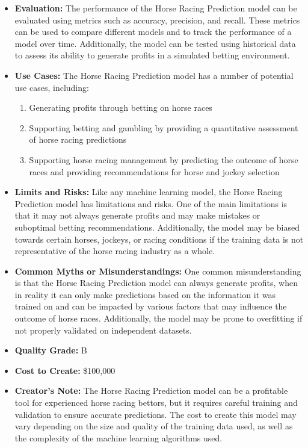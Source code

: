 \begin{itemize}
\item \textbf{Evaluation:} The performance of the Horse Racing Prediction model can be evaluated using metrics such as accuracy, precision, and recall. These metrics can be used to compare different models and to track the performance of a model over time. Additionally, the model can be tested using historical data to assess its ability to generate profits in a simulated betting environment.
\item \textbf{Use Cases:} The Horse Racing Prediction model has a number of potential use cases, including:
\begin{enumerate}
\item Generating profits through betting on horse races
\item Supporting betting and gambling by providing a quantitative assessment of horse racing predictions
\item Supporting horse racing management by predicting the outcome of horse races and providing recommendations for horse and jockey selection
\end{enumerate}
\item \textbf{Limits and Risks:} Like any machine learning model, the Horse Racing Prediction model has limitations and risks. One of the main limitations is that it may not always generate profits and may make mistakes or suboptimal betting recommendations. Additionally, the model may be biased towards certain horses, jockeys, or racing conditions if the training data is not representative of the horse racing industry as a whole.
\item \textbf{Common Myths or Misunderstandings:} One common misunderstanding is that the Horse Racing Prediction model can always generate profits, when in reality it can only make predictions based on the information it was trained on and can be impacted by various factors that may influence the outcome of horse races. Additionally, the model may be prone to overfitting if not properly validated on independent datasets.
\item \textbf{Quality Grade:} B
\item \textbf{Cost to Create:} \$100,000
\item \textbf{Creator's Note:} The Horse Racing Prediction model can be a profitable tool for experienced horse racing bettors, but it requires careful training and validation to ensure accurate predictions. The cost to create this model may vary depending on the size and quality of the training data used, as well as the complexity of the machine learning algorithms used.


\end{itemize}
